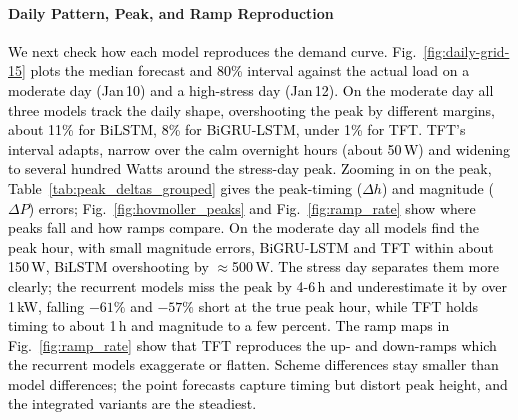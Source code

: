 \documentclass[final,10pt,1p,authoryear]{elsarticle}
\theoremstyle{definition}
\begin{document}
\paragraph{Daily Pattern, Peak, and Ramp Reproduction}
\textcolor{black}{We next check how each model reproduces the demand curve. Fig.~\ref{fig:daily-grid-15} plots the median forecast and 80\% interval against the actual load on a moderate day (Jan\,10) and a high-stress day (Jan\,12). On the moderate day all three models track the daily shape, overshooting the peak by different margins, about 11\% for BiLSTM, 8\% for BiGRU-LSTM, under 1\% for TFT. TFT's interval adapts, narrow over the calm overnight hours (about 50\,W) and widening to several hundred Watts around the stress-day peak.}
\textcolor{black}{Zooming in on the peak, Table~\ref{tab:peak_deltas_grouped} gives the peak-timing ($\Delta h$) and magnitude ($\Delta P$) errors; Fig.~\ref{fig:hovmoller_peaks} and Fig.~\ref{fig:ramp_rate} show where peaks fall and how ramps compare. On the moderate day all models find the peak hour, with small magnitude errors, BiGRU-LSTM and TFT within about 150\,W, BiLSTM overshooting by $\approx$500\,W. The stress day separates them more clearly; the recurrent models miss the peak by 4-6\,h and underestimate it by over 1\,kW, falling $-61\%$ and $-57\%$ short at the true peak hour, while TFT holds timing to about 1\,h and magnitude to a few percent. The ramp maps in Fig.~\ref{fig:ramp_rate} show that TFT reproduces the up- and down-ramps which the recurrent models exaggerate or flatten. Scheme differences stay smaller than model differences; the point forecasts capture timing but distort peak height, and the integrated variants are the steadiest.}
\end{document}
